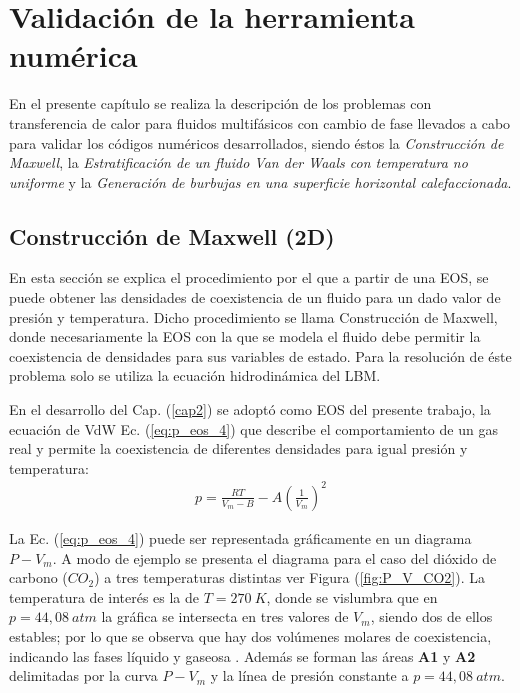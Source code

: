 \chapter{Validación de la herramienta numérica }
\graphicspath{{figs/cap4/}}
\label{cap4}

En el presente capítulo se realiza la descripción de los problemas con transferencia de calor para fluidos multifásicos con cambio de fase llevados a cabo para validar los códigos numéricos desarrollados, siendo éstos la \textit{Construcción de Maxwell}, la \textit{Estratificación de un fluido Van der Waals con temperatura no uniforme} y la \textit{Generación de burbujas en una superficie horizontal calefaccionada}.

\section{Construcción de Maxwell (2D)}

En esta sección se explica el procedimiento por el que a partir de una EOS, se puede obtener las densidades de coexistencia de un fluido para un dado valor de presión y temperatura. Dicho procedimiento se llama Construcción de Maxwell, donde necesariamente la EOS con la que se modela el fluido debe permitir la coexistencia de densidades para sus variables de estado. Para la resolución de éste problema solo se utiliza la ecuación hidrodinámica del LBM.

En el desarrollo del Cap. (\ref{cap2}) se adoptó como EOS del presente trabajo, la ecuación de VdW Ec. (\ref{eq:p_eos_4}) que describe el comportamiento de un gas real y permite la coexistencia de diferentes densidades para igual presión y temperatura:
\begin{align}
	p = \frac{R T}{V_m - B} - A {\left(\frac{1}{V_m}\right)}^2
	\label{eq:p_eos_4}
\end{align}

La Ec. (\ref{eq:p_eos_4}) puede ser representada gráficamente en un diagrama $P - V_m$. A modo de ejemplo se presenta el diagrama para el caso del dióxido de carbono ($CO_2$) a tres temperaturas distintas ver Figura (\ref{fig:P_V_CO2}).  La temperatura de interés es la de $T = 270 \> K$, donde se vislumbra que en $p = 44,08 \> atm$ la gráfica se intersecta en tres valores de $V_m$, siendo dos de ellos estables; por lo que se observa que hay dos volúmenes molares de coexistencia, indicando las fases líquido y gaseosa \cite{huang2015multiphase}. Además se forman las áreas \textbf{A1} y \textbf{A2} delimitadas por la curva $P - V_m$ y la línea de presión constante a $p = 44,08 \> atm$. 

